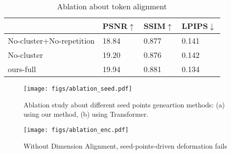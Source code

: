 \begin{table}%
\caption{ Quantitative evaluation of our method compared to previous work. $\dagger$ achieves relatively lower PSNR values in the evaluation, so we display the results in Sec. \ref{sec:comparison}.}
\label{tab:quantitative comparison}
\end{table}%


\begin{table}%
\caption{Ablation about token alignment}
\label{tab:ablation-tokenalign}
\begin{minipage}{\columnwidth}
\begin{center}
\begin{tabular}{llll}
  \toprule
   & PSNR$\uparrow$& SSIM$\uparrow$& LPIPS$\downarrow$ 
   \\ \midrule
  No-cluster+No-repetition  & 18.84&0.877&0.141\\
  No-cluster     & 19.20 &0.876&0.142\\
  ours-full  &19.94 &0.881&0.134\\
  \bottomrule
\end{tabular}
\end{center}
\bigskip\centering


\end{minipage}
\end{table}%

\begin{figure}
  \texttt{[image: figs/ablation\_seed.pdf]}
  \caption{Ablation study about different seed points geneartion methods: (a) using our method, (b) using Transformer.}
  \label{fig:ablation-seed-gen}
\end{figure}

\begin{figure}
  \texttt{[image: figs/ablation\_enc.pdf]}
  \caption{Without Dimension Alignment, seed-points-driven deformation fails}
  \label{fig:ablation-seed-enc}
\end{figure}


